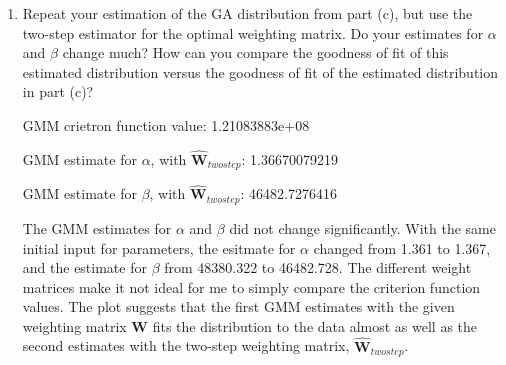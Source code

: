\documentclass[letterpaper,12pt]{article}
\theoremstyle{definition}
\begin{document}
\begin{enumerate}
\begin{enumerate}
\item Repeat your estimation of the GA distribution from part (c), but use the two-step estimator for the optimal weighting matrix. Do your estimates for $\alpha$ and $\beta$ change much? How can you compare the goodness of fit of this estimated distribution versus the goodness of fit of the estimated distribution in part (c)?
\par
\begin{figure}[H]\centering\captionsetup{width=4.0in}
\end{figure}
\par
GMM crietron function value: 1.21083883e+08\par
GMM estimate for $\alpha$, with $\hat{\textbf{W}}_{twostep}$: 1.36670079219 \par
GMM estimate for $\beta$, with $\hat{\textbf{W}}_{twostep}$: 46482.7276416\par
\bigskip
The GMM estimates for $\alpha$ and $\beta$ did not change significantly. With the same initial input for parameters, the esitmate for $\alpha$ changed from 1.361 to 1.367, and the estimate for $\beta$ from 48380.322 to 46482.728. The different weight matrices make it not ideal for me to simply compare the criterion function values. The plot suggests that the first GMM estimates with the given weighting matrix $\textbf{W}$ fits the distribution to the data almost as well as the second estimates with the two-step weighting matrix, $\hat{\textbf{W}}_{twostep}$. 
\end {enumerate}
\end {enumerate}
\end{document}
